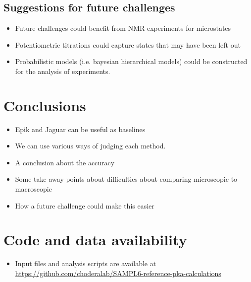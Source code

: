 \documentclass[9pt,lineno]{elife}
\begin{document}
\subsection{Suggestions for future challenges}
\begin{itemize}
    \item Future challenges could benefit from NMR experiments for microstates
    \item Potentiometric titrations could capture states that may have been left out
    \item Probabilistic models (i.e. bayesian hierarchical models) could be constructed for the analysis of experiments. 
\end{itemize}

\section{Conclusions}

\begin{itemize}
    \item Epik and Jaguar can be useful as baselines
    \item We can use various ways of judging each method.
    \item A conclusion about the accuracy
    \item Some take away points about difficulties about comparing microscopic to macroscopic
    \item How a future challenge could make this easier
\end{itemize}



\section{Code and data availability}

\begin{itemize}
\item Input files and analysis scripts are available at \href{https://github.com/choderalab/SAMPL6-reference-pka-calculations}{https://github.com/choderalab/SAMPL6-reference-pka-calculations}
\end{itemize}

\end{document}
